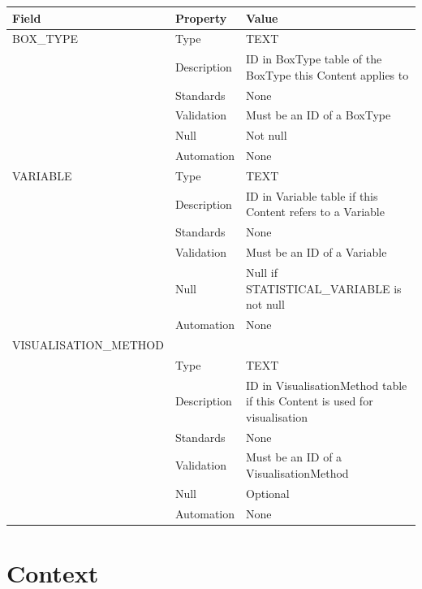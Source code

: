 \begin{longtable}[]{@{}
  >{\raggedright\arraybackslash}p{}
  >{\raggedright\arraybackslash}p{}
  >{\raggedright\arraybackslash}p{}@{}}
\toprule\noalign{}
\begin{minipage}[b]{\linewidth}\raggedright
Field
\end{minipage} & \begin{minipage}[b]{\linewidth}\raggedright
Property
\end{minipage} & \begin{minipage}[b]{\linewidth}\raggedright
Value
\end{minipage} \\
\midrule\noalign{}
\endhead
\bottomrule\noalign{}
\endlastfoot
BOX\_TYPE & Type & TEXT \\
& Description & ID in BoxType table of the BoxType this Content applies
to \\
& Standards & None \\
& Validation & Must be an ID of a BoxType \\
& Null & Not null \\
& Automation & None \\
VARIABLE & Type & TEXT \\
& Description & ID in Variable table if this Content refers to a
Variable \\
& Standards & None \\
& Validation & Must be an ID of a Variable \\
& Null & Null if STATISTICAL\_VARIABLE is not null \\
& Automation & None \\
VISUALISATION\_METHOD & & \\
& Type & TEXT \\
& Description & ID in VisualisationMethod table if this Content is used
for visualisation \\
& Standards & None \\
& Validation & Must be an ID of a VisualisationMethod \\
& Null & Optional \\
& Automation & None \\
\end{longtable}

\section{Context}\label{context}

